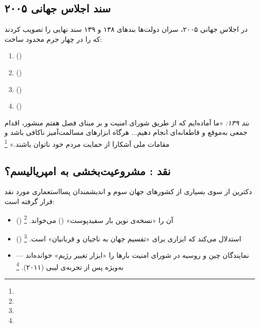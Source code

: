 \subsection{سند اجلاس جهانی ۲۰۰۵}
\label{subsec:ch02-world-summit}

در اجلاس جهانی ۲۰۰۵، سران دولت‌ها بندهای ۱۳۸ و ۱۳۹ سند نهایی را تصویب کردند که  را در چهار جرم محدود ساخت:

\begin{tcolorbox}[enemybox, title={چهار جرم مشمول مسئولیت حمایت}]
\begin{enumerate}[nosep, label=\textbf{\arabic*.}]
  \item {} ()
  \item {} ()
  \item {} ()
  \item {} ()
\end{enumerate}
\vspace{4pt}
\textit{بند ۱۳۹:} «ما آماده‌ایم که از طریق شورای امنیت و بر مبنای فصل هفتم منشور، اقدام جمعی به‌موقع و قاطعانه‌ای انجام دهیم... هرگاه ابزارهای مسالمت‌آمیز ناکافی باشد و مقامات ملی آشکارا از حمایت مردم خود ناتوان باشند.»%
\footnote{}
\end{tcolorbox}

\subsection{نقد \texorpdfstring{}{R2P}: مشروعیت‌بخشی به امپریالیسم؟}
\label{subsec:ch02-r2p-critique}

دکترین  از سوی بسیاری از کشورهای جهان سوم و اندیشمندان پسااستعماری مورد نقد قرار گرفته است:

\begin{itemize}[nosep, rightmargin=1em]
  \item {} () آن را «نسخه‌ی نوین بار سفیدپوست» () می‌خواند.%
  \footnote{}
  \item {} () استدلال می‌کند که  ابزاری برای «تقسیم جهان به ناجیان و قربانیان» است.%
  \footnote{}
  \item نمایندگان چین و روسیه در شورای امنیت بارها  را «ابزار تغییر رژیم» خوانده‌اند — به‌ویژه پس از تجربه‌ی لیبی (۲۰۱۱).%
  \footnote{}
\end{itemize}

